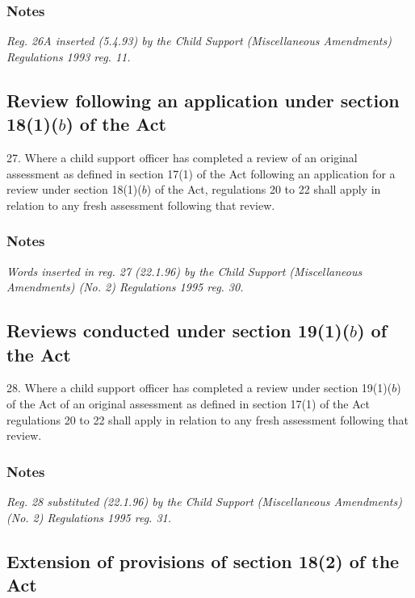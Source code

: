 \documentclass[a4paper]{article}
\newcommand\amendment[1]{\subsubsection*{Notes}{\itshape\frenchspacing\footnotesize #1 \par}}
\begin{document}
\amendment{
Reg. 26A inserted (5.4.93) by the Child Support (Miscellaneous Amendments) Regulations 1993 reg. 11.
}

\subsection[27. Review following an application under section 18(1)($b$) of the Act]{Review following an application under section 18(1)($b$) of the Act}

27.  Where a child support officer has completed a review 
of an original assessment as defined in section 17(1) of the Act  %
following an application for a review under section 18(1)($b$) of the Act, regulations 20 to 22 shall apply in relation to any fresh assessment following that review.

\amendment{
Words inserted in reg. 27 (22.1.96) by the Child Support (Miscellaneous Amendments) (No. 2) Regulations 1995 reg. 30.
}

%

\subsection[28. Reviews conducted under section 19(1)($b$) of the Act]{Reviews conducted under section 19(1)($b$) of the Act}

28.  Where a child support officer has completed a review under section 19(1)($b$) of the Act of an original assessment as defined in section 17(1) of the Act regulations 20 to 22 shall apply in relation to any fresh assessment following that review.

\amendment{
Reg. 28 substituted (22.1.96) by the Child Support (Miscellaneous Amendments) (No. 2) Regulations 1995 reg. 31.
}

\subsection[29. Extension of provisions of section 18(2) of the Act]{Extension of provisions of section 18(2) of the Act}
\end{document}
